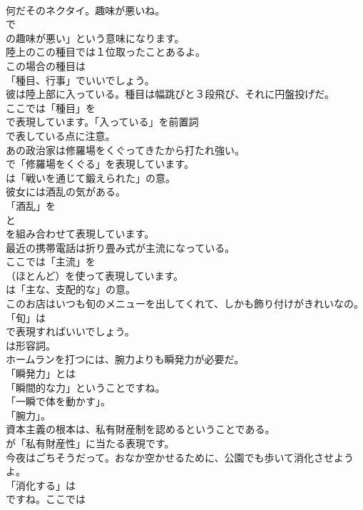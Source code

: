 \documentclass[8pt]{extreport}
\begin{document}
\begin{CJK}{UTF8}{min}
\\	何だそのネクタイ。趣味が悪いね。 
\\	で
\\	の趣味が悪い」という意味になります。	
\\	陸上のこの種目では１位取ったことあるよ。 
\\	この場合の種目は
\\	「種目、行事」でいいでしょう。	
\\	彼は陸上部に入っている。種目は幅跳びと３段飛び、それに円盤投げだ。 
\\	ここでは「種目」を 
\\	で表現しています。「入っている」を前置詞 
\\	で表している点に注意。	
\\	あの政治家は修羅場をくぐってきたから打たれ強い。 
\\	で「修羅場をくぐる」を表現しています。
\\	は「戦いを通じて鍛えられた」の意。	
\\	彼女には酒乱の気がある。 
\\	「酒乱」を
\\	と
\\	を組み合わせて表現しています。	
\\	最近の携帯電話は折り畳み式が主流になっている。 
\\	ここでは「主流」を 
\\	（ほとんど）を使って表現しています。
\\	は「主な、支配的な」の意。	
\\	このお店はいつも旬のメニューを出してくれて、しかも飾り付けがきれいなの。 
\\	「旬」は 
\\	で表現すればいいでしょう。
\\	は形容詞。	
\\	ホームランを打つには、腕力よりも瞬発力が必要だ。 
\\	「瞬発力」とは
\\	「瞬間的な力」ということですね。
\\	「一瞬で体を動かす」。
\\	「腕力」。	
\\	資本主義の根本は、私有財産制を認めるということである。 
\\	が「私有財産性」に当たる表現です。	
\\	今夜はごちそうだって。おなか空かせるために、公園でも歩いて消化させようよ。 
\\	「消化する」は
\\	ですね。ここでは

\end{CJK}
\end{document}
